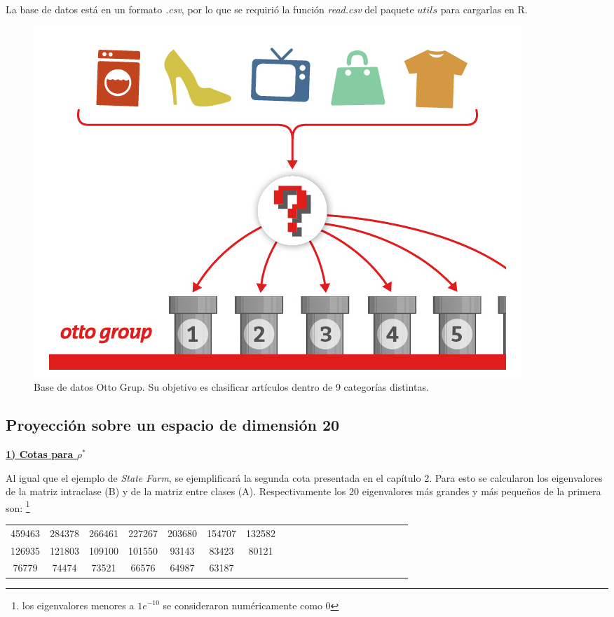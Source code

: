 La base de datos está en un formato \textit{.csv}, por lo que se requirió la función \textit{read.csv} del paquete $utils$ para cargarlas en R. 

\begin{figure}[!ht]
  \centering
  \includegraphics[width=.9\textwidth]{Figures/Chapter4_imagenOtto.png} 
  \caption[Ejemplo de la base de datos (Otto Group)]
  {Base de datos Otto Grup. Su objetivo es clasificar artículos dentro de 9 categorías distintas.}
\end{figure}



\pagebreak

\subsection{Proyección sobre un espacio de dimensión 20}

\underline{\textbf{1) Cotas para $\rho^*$}}

Al igual que el ejemplo de \textit{State Farm}, se ejemplificará la segunda cota presentada en el capítulo 2. Para esto se calcularon los eigenvalores de la matriz intraclase (B) y de la matriz entre clases (A). Respectivamente los 20 eigenvalores más grandes y más pequeños de la primera son: \footnote{los eigenvalores menores a $1e^{-10}$ se consideraron numéricamente como 0}

\begin{center}
\begin{tabular}{ | c | c|  c |c | c|  c |c | c|  c |c | c | c|  c |c | c|  c |c | c|  c |c |} 
\hline
459463 & 284378 & 266461 & 227267 & 203680 & 154707 & 132582 \\
126935 & 121803 & 109100 & 101550 & 93143 & 83423 & 80121 \\
76779 & 74474 & 73521 & 66576 & 64987 & 63187 &\\
\hline
\hline
\end{tabular}
\end{center}

